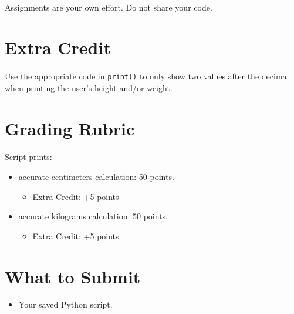 \documentclass[letter,10pt]{article}
\begin{document}
    \paragraph{}Assignments are your own effort. Do not share your code.
    
    \section*{Extra Credit}
    \paragraph{}Use the appropriate code in \texttt{print()} to only show two values after the decimal when printing the user's height and/or weight.
    
    \section*{Grading Rubric}
    \paragraph{}Script prints:
    \begin{itemize}
        \item accurate centimeters calculation: 50 points.
        \begin{itemize}
            \item Extra Credit: +5 points
        \end{itemize}
        \item accurate kilograms calculation: 50 points.
        \begin{itemize}
            \item Extra Credit: +5 points
        \end{itemize}
    \end{itemize}
    
    \section*{What to Submit}
    \begin{itemize}
        \item Your saved Python script.
    \end{itemize}
    
\end{document}
